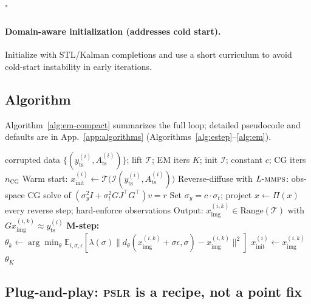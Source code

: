 "\documentclass{article}
\theoremstyle{plain}
\theoremstyle{definition}
\theoremstyle{remark}
\newcommand{\tsimg}{\mathcal{T}}
\newcommand{\pslr}{\textsc{pslr}}
\newcommand{\lmmps}{L\mbox{-}\textsc{mmps}}
\newcommand{\Ats}{A_{\mathrm{ts}}}
\newcommand{\yts}{y_{\mathrm{ts}}}
\newcommand{\ximg}{x_{\mathrm{img}}}
\begin{document}
\paragraph{Domain-aware initialization (addresses cold start).}
Initialize with STL/Kalman completions and use a short curriculum to avoid cold-start instability in early iterations.

\vspace{-1mm}
\subsection{Algorithm}
\label{subsec:algorithm}
\vspace{-1mm}

Algorithm~\ref{alg:em-compact} summarizes the full loop; detailed pseudocode and defaults are in App.~\ref{app:algorithms} (Algorithms~\ref{alg:estep}--\ref{alg:em}).

\begin{algorithm}[h]
\caption{Co-Evolving EM with $\lmmps$ E-step (compact)}
\label{alg:em-compact}
\begin{algorithmic}[1]
\Require corrupted data $\{(\yts^{(i)}, \Ats^{(i)})\}$; lift $\tsimg$; EM iters $K$; init $\mathcal{I}$; constant $c$; CG iters $n_{\mathrm{CG}}$
\State Warm start: $x_{\mathrm{init}}^{(i)} \gets \tsimg \bigl(\mathcal{I}(\yts^{(i)}, \Ats^{(i)})\bigr)$ 
   
    \State Reverse-diffuse with $\lmmps$: obs-space CG solve of $(\sigma_y^2 I + \sigma_t^2 G J^\top G^\top) v = r$ \Comment{\pslr{}(MMPS)}
    \State Set $\sigma_y = c \cdot \sigma_t$; project $x \gets \Pi(x)$ every reverse step; hard-enforce observations
    \State Output: $\ximg^{(i,k)} \in \mathrm{Range}(\tsimg)$ with $G \ximg^{(i,k)} \approx \yts^{(i)}$
  \EndFor
  \State \textbf{M-step:} $\theta_k \gets \arg\min_\theta \mathbb{E}_{i,\sigma,\epsilon}[\lambda(\sigma) \|d_\theta(\ximg^{(i,k)} + \sigma\epsilon, \sigma) - \ximg^{(i,k)}\|^2]$
  \State $x_{\mathrm{init}}^{(i)} \gets \ximg^{(i,k)}$ 
\EndFor
\State \Return $\theta_K$
\end{algorithmic}
\end{algorithm}


\vspace{-1mm}
\subsection{Plug-and-play: \pslr{} is a recipe, not a point fix}
\label{subsec:plug-and-play}
\vspace{-1mm}
\end{document}
